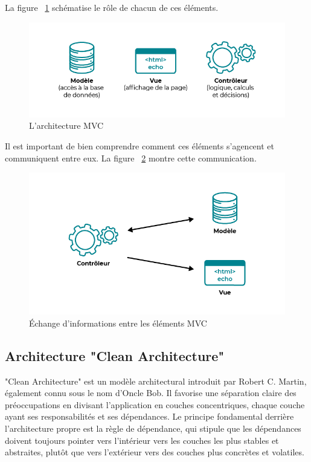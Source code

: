 \noindent
La figure ~\ref{fig:mvc} schématise le rôle de chacun de ces éléments.
\begin{figure}[H]
\centering
\includegraphics[width=1\textwidth]{logos/mvc.png}
\caption{L'architecture MVC}
\label{fig:mvc}
\end{figure}

\newpage
\noindent
Il est important de bien comprendre comment ces éléments s'agencent et communiquent entre eux. La figure ~\ref{fig:mvcechange} montre cette communication.

\begin{figure}[H]
\centering
\includegraphics[width=1\textwidth]{logos/mvcechange.png}
\caption{Échange d'informations entre les éléments MVC}
\label{fig:mvcechange}
\end{figure}

\subsection{Architecture "Clean Architecture"}
\noindent
"Clean Architecture" est un modèle architectural introduit par Robert C. Martin, également connu sous le nom d'Oncle Bob. Il favorise une séparation claire des préoccupations en divisant l'application en couches concentriques, chaque couche ayant ses responsabilités et ses dépendances. Le principe fondamental derrière l'architecture propre est la règle de dépendance, qui stipule que les dépendances doivent toujours pointer vers l'intérieur vers les couches les plus stables et abstraites, plutôt que vers l'extérieur vers des couches plus concrètes et volatiles. 

